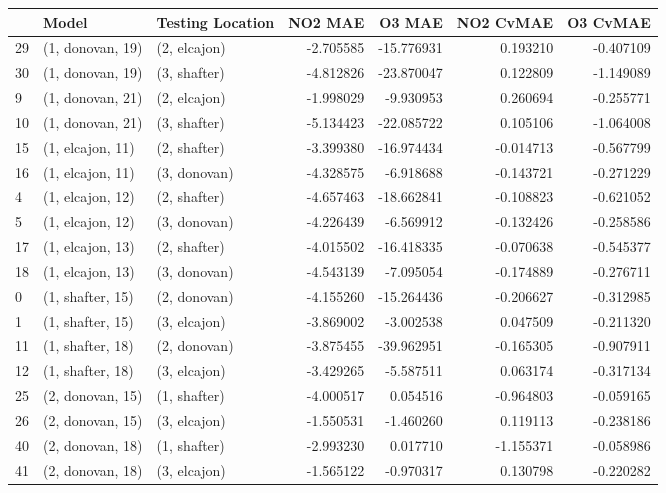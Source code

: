 \begin{tabular}{lllrrrr}
\toprule
{} &             Model & Testing Location &    NO2 MAE &     O3 MAE &  NO2 CvMAE &  O3 CvMAE \\
\midrule
29 &  (1, donovan, 19) &     (2, elcajon) &  -2.705585 & -15.776931 &   0.193210 & -0.407109 \\
30 &  (1, donovan, 19) &     (3, shafter) &  -4.812826 & -23.870047 &   0.122809 & -1.149089 \\
9  &  (1, donovan, 21) &     (2, elcajon) &  -1.998029 &  -9.930953 &   0.260694 & -0.255771 \\
10 &  (1, donovan, 21) &     (3, shafter) &  -5.134423 & -22.085722 &   0.105106 & -1.064008 \\
15 &  (1, elcajon, 11) &     (2, shafter) &  -3.399380 & -16.974434 &  -0.014713 & -0.567799 \\
16 &  (1, elcajon, 11) &     (3, donovan) &  -4.328575 &  -6.918688 &  -0.143721 & -0.271229 \\
4  &  (1, elcajon, 12) &     (2, shafter) &  -4.657463 & -18.662841 &  -0.108823 & -0.621052 \\
5  &  (1, elcajon, 12) &     (3, donovan) &  -4.226439 &  -6.569912 &  -0.132426 & -0.258586 \\
17 &  (1, elcajon, 13) &     (2, shafter) &  -4.015502 & -16.418335 &  -0.070638 & -0.545377 \\
18 &  (1, elcajon, 13) &     (3, donovan) &  -4.543139 &  -7.095054 &  -0.174889 & -0.276711 \\
0  &  (1, shafter, 15) &     (2, donovan) &  -4.155260 & -15.264436 &  -0.206627 & -0.312985 \\
1  &  (1, shafter, 15) &     (3, elcajon) &  -3.869002 &  -3.002538 &   0.047509 & -0.211320 \\
11 &  (1, shafter, 18) &     (2, donovan) &  -3.875455 & -39.962951 &  -0.165305 & -0.907911 \\
12 &  (1, shafter, 18) &     (3, elcajon) &  -3.429265 &  -5.587511 &   0.063174 & -0.317134 \\
25 &  (2, donovan, 15) &     (1, shafter) &  -4.000517 &   0.054516 &  -0.964803 & -0.059165 \\
26 &  (2, donovan, 15) &     (3, elcajon) &  -1.550531 &  -1.460260 &   0.119113 & -0.238186 \\
40 &  (2, donovan, 18) &     (1, shafter) &  -2.993230 &   0.017710 &  -1.155371 & -0.058986 \\
41 &  (2, donovan, 18) &     (3, elcajon) &  -1.565122 &  -0.970317 &   0.130798 & -0.220282 \\

\end{tabular}
